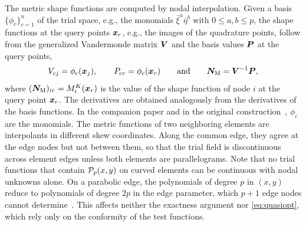 The metric shape functions are computed by nodal interpolation. Given a basis $\{\phi_c\}_{c=1}^n$ of the trial space, e.g., the monomials $\bar\xi^a\bar\eta^b$ with $0\le a,b\le p$, the shape functions at the query points $\bm{x}_r$, e.g., the images of the quadrature points, follow from the generalized Vandermonde matrix $\bm{V}$ and the basis values $\bm{P}$ at the query points,
%
\begin{equation}
  V_{cj}=\phi_c(\bm{x}_j),\qquad P_{cr}=\phi_c(\bm{x}_r)\qquad\text{and}\qquad
  \bm{N}_{\mathrm M}=\bm{V}^{-1}\bm{P} ,
  \label{eq:vandermonde}
\end{equation}
%
where $(\bm{N}_{\mathrm M})_{ir}=M_i^K(\bm{x}_r)$ is the value of the shape function of node $i$ at the query point $\bm{x}_r$. The derivatives are obtained analogously from the derivatives of the basis functions. In the companion paper and in the original construction~\cite{Rajendran2003novel,Ooi2006unsymmetric}, $\phi_c$ are the monomials. The metric functions of two neighboring elements are interpolants in different skew coordinates. Along the common edge, they agree at the edge nodes but not between them, so that the trial field is discontinuous across element edges unless both elements are parallelograms. Note that no trial functions that contain $\mathcal P_p(x,y)$ on curved elements can be continuous with nodal unknowns alone. On a parabolic edge, the polynomials of degree $p$ in $(x,y)$ reduce to polynomials of degree $2p$ in the edge parameter, which $p+1$ edge nodes cannot determine~\cite{Eisentraeger2026axisymmetric}. This affects neither the exactness argument nor \cref{eq:quasiopt}, which rely only on the conformity of the test functions.

